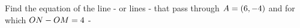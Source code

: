 
%
%
%
%      
% 
% 
%   



\question Find the equation of the line - or lines - that pass through $A = (6, -4)$ 
and for which $ON - OM = 4$ - \asif

